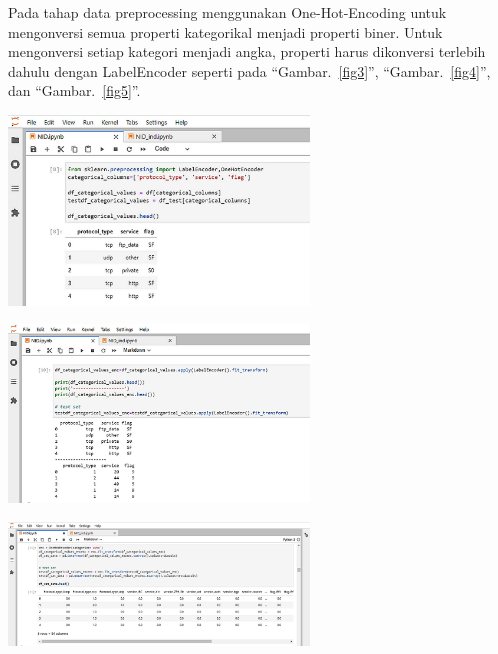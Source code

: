 \documentclass[conference]{IEEEtran}
\begin{document}
Pada tahap data preprocessing menggunakan One-Hot-Encoding untuk mengonversi semua properti kategorikal menjadi properti biner. Untuk mengonversi setiap kategori menjadi angka, properti harus dikonversi terlebih dahulu dengan LabelEncoder seperti pada ``Gambar.~\ref{fig3}'', ``Gambar.~\ref{fig4}'', dan ``Gambar.~\ref{fig5}''.\\

\begin{minipage}{\linewidth}
\centerline{\includegraphics[width=80mm]{Gambar/Gbr02.jpg}}
\label{fig3}
\end{minipage}

\begin{minipage}{\linewidth}
\centerline{\includegraphics[width=80mm]{Gambar/Gbr03.jpg}}
\label{fig4}
\end{minipage}

\begin{minipage}{\linewidth}
\centerline{\includegraphics[width=80mm]{Gambar/Gbr04.jpg}}
\label{fig5}
\end{minipage}\\
\end{document}
